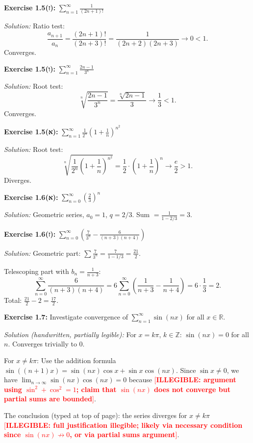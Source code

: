 \documentclass[12pt, a4paper]{article}
\newcommand{\illegible}[1][?]{\textcolor{red}{[\textbf{ILLEGIBLE: #1}]}}
\theoremstyle{definition}
\theoremstyle{remark}
\begin{document}
\bigskip
\noindent\textbf{Exercise 1.5(ז):} $\displaystyle\sum_{n=1}^\infty \frac{1}{(2n+1)!}$

\textit{Solution:} Ratio test:
\[
  \frac{a_{n+1}}{a_n} = \frac{(2n+1)!}{(2n+3)!} = \frac{1}{(2n+2)(2n+3)} \to 0 < 1.
\]
Converges.

\bigskip
\noindent\textbf{Exercise 1.5(ו):} $\displaystyle\sum_{n=1}^\infty \frac{2n-1}{3^n}$

\textit{Solution:} Root test:
\[
  \sqrt[n]{\frac{2n-1}{3^n}} = \frac{\sqrt[n]{2n-1}}{3} \to \frac{1}{3} < 1.
\]
Converges.

\bigskip
\noindent\textbf{Exercise 1.5(א):} $\displaystyle\sum_{n=1}^\infty \frac{1}{2^n}\left(1+\frac{1}{n}\right)^{n^2}$

\textit{Solution:} Root test:
\[
  \sqrt[n]{\frac{1}{2^n}\left(1+\frac{1}{n}\right)^{n^2}} = \frac{1}{2}\cdot\left(1+\frac{1}{n}\right)^n \to \frac{e}{2} > 1.
\]
Diverges.

\bigskip
\noindent\textbf{Exercise 1.6(א):} $\displaystyle\sum_{n=0}^\infty \left(\frac{2}{3}\right)^n$

\textit{Solution:} Geometric series, $a_0 = 1$, $q = 2/3$. Sum $= \frac{1}{1-2/3} = 3$.

\bigskip
\noindent\textbf{Exercise 1.6(ז):} $\displaystyle\sum_{n=0}^\infty \left(\frac{7}{3^n} - \frac{6}{(n+3)(n+4)}\right)$

\textit{Solution:}
Geometric part: $\sum \frac{7}{3^n} = \frac{7}{1-1/3} = \frac{21}{2}$.

Telescoping part with $b_n = \frac{1}{n+3}$:
\[
  \sum_{n=0}^\infty \frac{6}{(n+3)(n+4)} = 6\sum_{n=0}^\infty\left(\frac{1}{n+3}-\frac{1}{n+4}\right) = 6\cdot\frac{1}{3} = 2.
\]
Total: $\frac{21}{2} - 2 = \frac{17}{2}$.

\bigskip
\noindent\textbf{Exercise 1.7:} Investigate convergence of $\displaystyle\sum_{n=1}^\infty \sin(nx)$ for all $x \in \mathbb{R}$.

\textit{Solution (handwritten, partially legible):}
For $x = k\pi$, $k\in\mathbb{Z}$: $\sin(nx)=0$ for all $n$. Converges trivially to 0.

For $x \neq k\pi$: Use the addition formula $\sin((n+1)x) = \sin(nx)\cos x + \sin x \cos(nx)$.
Since $\sin x \neq 0$, we have $\lim_{n\to\infty}\sin(nx)\cos(nx) = 0$ because \illegible[argument using $\sin^2+\cos^2=1$; claim that $\sin(nx)$ does not converge but partial sums are bounded].

The conclusion (typed at top of page): the series diverges for $x \neq k\pi$ \illegible[full justification illegible; likely via necessary condition since $\sin(nx)\not\to 0$, or via partial sums argument].
\end{document}

